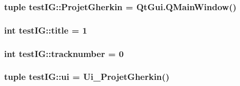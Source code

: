 \label{namespacetestIG_a5e7314a258b3a05057454cc56cd727e3}
\hypertarget{namespacetestIG_adba3aa3a2d00ebea0a8188c4b79bcb59}{
\subsubsection[{ProjetGherkin}]{\setlength{\rightskip}{0pt plus 5cm}tuple {\bf testIG::ProjetGherkin} = QtGui.QMainWindow()}}
\label{namespacetestIG_adba3aa3a2d00ebea0a8188c4b79bcb59}
\hypertarget{namespacetestIG_aa2f01d25063e0d8fe853d858acbf1b6d}{
\subsubsection[{title}]{\setlength{\rightskip}{0pt plus 5cm}int {\bf testIG::title} = 1}}
\label{namespacetestIG_aa2f01d25063e0d8fe853d858acbf1b6d}
\hypertarget{namespacetestIG_aa789580a63cc2a57bd7acfe5c8bb71b1}{
\subsubsection[{tracknumber}]{\setlength{\rightskip}{0pt plus 5cm}int {\bf testIG::tracknumber} = 0}}
\label{namespacetestIG_aa789580a63cc2a57bd7acfe5c8bb71b1}
\hypertarget{namespacetestIG_ab7ec909c09b6b583e68b8b63657605d7}{
\subsubsection[{ui}]{\setlength{\rightskip}{0pt plus 5cm}tuple {\bf testIG::ui} = {\bf Ui\_\-ProjetGherkin}()}}
\label{namespacetestIG_ab7ec909c09b6b583e68b8b63657605d7}
